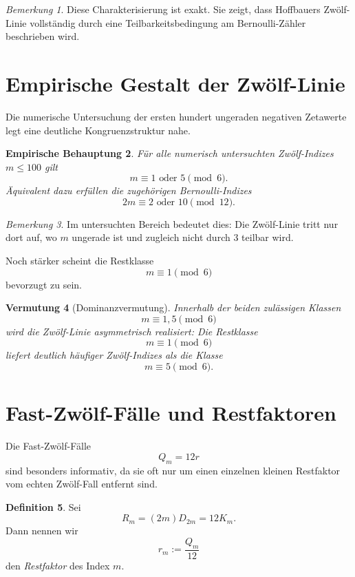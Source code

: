 \documentclass[11pt,a4paper]{article}
\theoremstyle{definition}
\newtheorem{definition}{Definition}[section]
\theoremstyle{plain}
\newtheorem{vermutung}[definition]{Vermutung}
\newtheorem{empirischebehauptung}[definition]{Empirische Behauptung}
\theoremstyle{remark}
\newtheorem{bemerkung}[definition]{Bemerkung}
\begin{document}
	\begin{bemerkung}
		Diese Charakterisierung ist exakt. Sie zeigt, dass Hoffbauers Zwölf-Linie vollständig durch eine Teilbarkeitsbedingung am Bernoulli-Zähler beschrieben wird.
	\end{bemerkung}
	
	\section{Empirische Gestalt der Zwölf-Linie}
	
	Die numerische Untersuchung der ersten hundert ungeraden negativen Zetawerte legt eine deutliche Kongruenzstruktur nahe.
	
	\begin{empirischebehauptung}
		Für alle numerisch untersuchten Zwölf-Indizes $m\le 100$ gilt
		\[
		m\equiv 1 \text{ oder } 5 \pmod 6.
		\]
		Äquivalent dazu erfüllen die zugehörigen Bernoulli-Indizes
		\[
		2m\equiv 2 \text{ oder } 10 \pmod{12}.
		\]
	\end{empirischebehauptung}
	
	\begin{bemerkung}
		Im untersuchten Bereich bedeutet dies: Die Zwölf-Linie tritt nur dort auf, wo $m$ ungerade ist und zugleich nicht durch $3$ teilbar wird.
	\end{bemerkung}
	
	Noch stärker scheint die Restklasse
	\[
	m\equiv 1 \pmod 6
	\]
	bevorzugt zu sein.
	
	\begin{vermutung}[Dominanzvermutung]
		Innerhalb der beiden zulässigen Klassen
		\[
		m\equiv 1,5 \pmod 6
		\]
		wird die Zwölf-Linie asymmetrisch realisiert: Die Restklasse
		\[
		m\equiv 1\pmod 6
		\]
		liefert deutlich häufiger Zwölf-Indizes als die Klasse
		\[
		m\equiv 5\pmod 6.
		\]
	\end{vermutung}
	
	\section{Fast-Zwölf-Fälle und Restfaktoren}
	
	Die Fast-Zwölf-Fälle
	\[
	Q_m=12r
	\]
	sind besonders informativ, da sie oft nur um einen einzelnen kleinen Restfaktor vom echten Zwölf-Fall entfernt sind.
	
	\begin{definition}
		Sei
		\[
		R_m=(2m)D_{2m}=12K_m.
		\]
		Dann nennen wir
		\[
		r_m:=\frac{Q_m}{12}
		\]
		den \emph{Restfaktor} des Index $m$.
	\end{definition}
	
\end{document}
